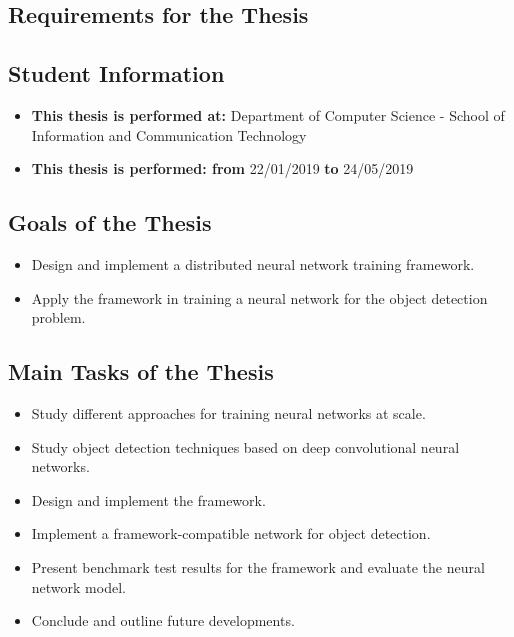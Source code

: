 \documentclass[a4paper, 13pt, oneside]{report}
\begin{document}
\fontsize {13pt}{16pt}
\selectfont

\setcounter{page}{1}
\begin{spacing}{1.0}
    \chapter*{Requirements for the Thesis}
    \section*{Student Information}
    \begin{itemize}
        \item \textbf{This thesis is performed at:} Department of Computer Science
        - School of Information and
        Communication Technology
        \item \textbf{This thesis is performed: from} 22/01/2019 \textbf{to}
        24/05/2019
    \end{itemize}
    \section*{Goals of the Thesis}
        \begin{itemize}
        \item Design and implement a distributed neural network training framework.
        \item Apply the framework in training a neural network for the object detection problem.
        \end{itemize}
    \section*{Main Tasks of the Thesis}
        \begin{itemize}
        \item Study different approaches for training neural networks at scale.
        \item Study object detection techniques based on deep convolutional neural networks.
        \item Design and implement the framework.
        \item Implement a framework-compatible network for object detection.
        \item Present benchmark test results for the framework and evaluate the neural network model.
        \item Conclude and outline future developments.
        \end{itemize}
    

\end{spacing}
\end{document}

